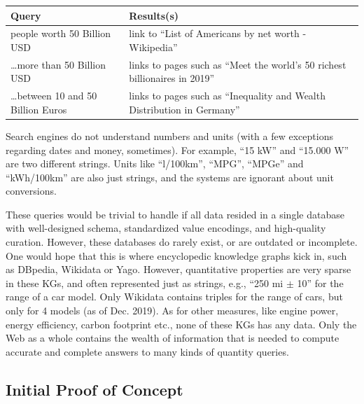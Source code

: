 \documentclass[11pt]{article}
\begin{document}
\begin{center}
{\small
\begin{tabular}{|p{5cm}|p{10cm}|}\hline
Query & Results(s) \\ \hline\hline
people worth 50 Billion USD & link to ``List of Americans by net worth - Wikipedia'' \\ \hline
\dots more than 50 Billion USD & links to pages such as
``Meet the world's 50 richest billionaires in 2019''\\ \hline
\dots between 10 and 50 Billion Euros & links to pages such as
``Inequality and Wealth Distribution in Germany'' \\ \hline
\end{tabular}
}
\end{center}

Search engines do not understand numbers and units (with a few exceptions
regarding dates and money, sometimes). For example, ``15 kW'' and
``15.000 W'' are two different strings.
Units like ``l/100km'', 
``MPG'', ``MPGe'' and ``kWh/100km'' are also just strings, and the systems are
ignorant about unit conversions.

These queries would be trivial to handle if all data resided
in a single database with well-designed schema,
standardized value encodings, and high-quality curation.
However, these databases do rarely exist, or are outdated or incomplete.
One would hope that this is where encyclopedic knowledge graphs
kick in, such as DBpedia, Wikidata or Yago.
However, quantitative properties are very sparse in these KGs,
and often represented just as strings, e.g., ``250 mi $\pm$ 10''
for the range of a car model.
Only Wikidata contains triples for the range of cars, but only for
4 models (as of Dec. 2019). 
As for other measures, like engine power, energy efficiency, carbon footprint etc.,
none of these KGs has any data.
Only the Web as a whole contains the wealth of information that
is needed to compute accurate and complete answers to
many kinds of quantity queries.






\subsection*{Initial Proof of Concept}
\end{document}
